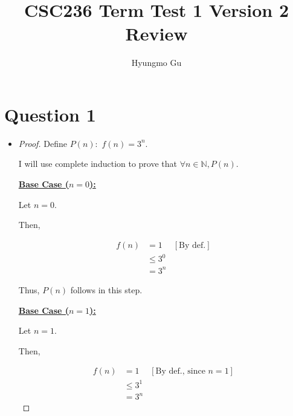 \documentclass[12pt]{article}
\begin{document}
\title{CSC236 Term Test 1 Version 2 Review}
\author{Hyungmo Gu}
\maketitle

\section*{Question 1}
\begin{itemize}
    \item

    \begin{proof}
        \setcounter{equation}{0}

        Define $P(n):$ $f(n)=3^n$.

        \bigskip

        I will use complete induction to prove that $\forall n \in \mathbb{N}, P(n)$.

        \bigskip

        \underline{\textbf{Base Case ($n = 0$):}}

        \bigskip

        Let $n = 0$.

        \bigskip

        Then,

        \begin{align}
            f(n) &= 1 & [\text{By def.}]\\
            &\leq 3^0\\
            &= 3^n
        \end{align}

        \bigskip

        Thus, $P(n)$ follows in this step.

        \bigskip

        \underline{\textbf{Base Case ($n = 1$):}}

        \bigskip

        Let $n = 1$.

        \bigskip

        Then,

        \begin{align}
            f(n) &= 1 & [\text{By def., since $n = 1$}]\\
            &\leq 3^1\\
            &= 3^n
        \end{align}

        \bigskip


\end{proof}
\end{itemize}
\end{document}
